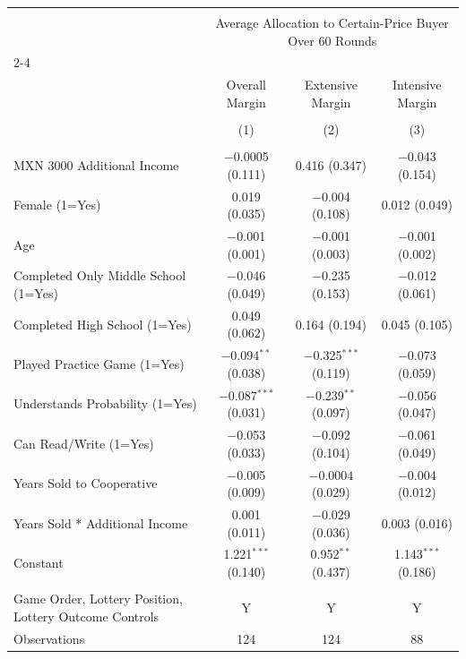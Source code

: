 
\begin{table}[!htbp] \centering 
   
   
\begin{tabular}{@{\extracolsep{5pt}}lccc} 
\\[-1.8ex]\hline 
\hline \\[-1.8ex] 
 & \multicolumn{3}{c}{Average Allocation to Certain-Price Buyer Over 60 Rounds} \\ 
\cline{2-4} 
\\[-1.8ex] & Overall Margin & Extensive Margin & Intensive Margin \\ 
\\[-1.8ex] & (1) & (2) & (3)\\ 
\hline \\[-1.8ex] 
 MXN 3000 Additional Income & $-$0.0005 (0.111) & 0.416 (0.347) & $-$0.043 (0.154) \\ 
  Female (1=Yes) & 0.019 (0.035) & $-$0.004 (0.108) & 0.012 (0.049) \\ 
  Age & $-$0.001 (0.001) & $-$0.001 (0.003) & $-$0.001 (0.002) \\ 
  Completed Only Middle School (1=Yes) & $-$0.046 (0.049) & $-$0.235 (0.153) & $-$0.012 (0.061) \\ 
  Completed High School (1=Yes) & 0.049 (0.062) & 0.164 (0.194) & 0.045 (0.105) \\ 
  Played Practice Game (1=Yes) & $-$0.094$^{**}$ (0.038) & $-$0.325$^{***}$ (0.119) & $-$0.073 (0.059) \\ 
  Understands Probability (1=Yes) & $-$0.087$^{***}$ (0.031) & $-$0.239$^{**}$ (0.097) & $-$0.056 (0.047) \\ 
  Can Read/Write (1=Yes) & $-$0.053 (0.033) & $-$0.092 (0.104) & $-$0.061 (0.049) \\ 
  Years Sold to Cooperative & $-$0.005 (0.009) & $-$0.0004 (0.029) & $-$0.004 (0.012) \\ 
  Years Sold * Additional Income & 0.001 (0.011) & $-$0.029 (0.036) & 0.003 (0.016) \\ 
  Constant & 1.221$^{***}$ (0.140) & 0.952$^{**}$ (0.437) & 1.143$^{***}$ (0.186) \\ 
 \hline \\[-1.8ex] 
Game Order, Lottery Position, Lottery Outcome Controls & Y & Y & Y \\ 
Observations & 124 & 124 & 88 \\ 

\end{tabular}
\end{table}
